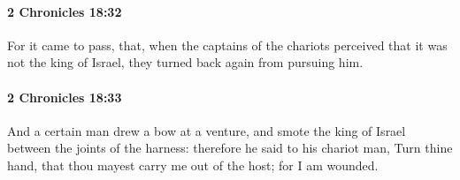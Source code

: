 		\paragraph{2 Chronicles 18:32} %
			\label{2CHRONICLES-18-32}

			For it came to pass, that, when the captains of the chariots perceived that it was not the king of Israel, they turned back again from pursuing him.


		\paragraph{2 Chronicles 18:33} %
			\label{2CHRONICLES-18-33}

			And a certain man drew a bow at a venture, and smote the king of Israel between the joints of the harness: therefore he said to his chariot man, Turn thine hand, that thou mayest carry me out of the host; for I am wounded.

